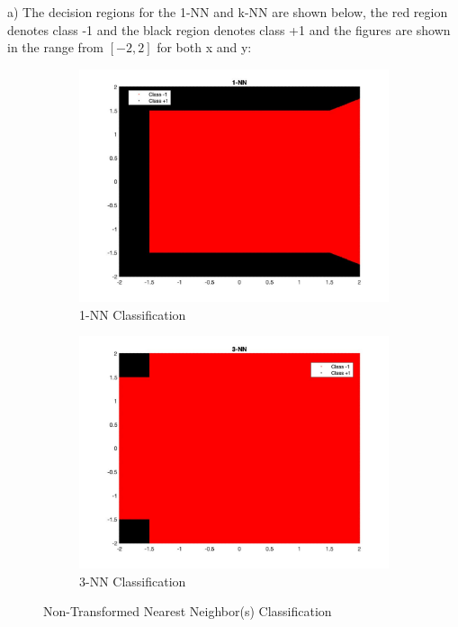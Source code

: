 \documentclass[12pt]{article}
\begin{document}
\newpage
{} \\\\
a) The decision regions for the 1-NN and k-NN are shown below, the red region denotes class -1 and the black region denotes class +1 and the figures are shown in the range from $\left[-2, 2\right]$ for both x and y:
\begin{figure}[H]
\centering
\begin{subfigure}{.5\textwidth}
  \centering
   \includegraphics[scale = 0.22]{1.jpg}
  \caption{1-NN Classification}
  \label{fig:1}
\end{subfigure}%
\begin{subfigure}{.5\textwidth}
  \centering
   \includegraphics[scale = 0.22]{2.jpg}
  \caption{3-NN Classification}
  \label{fig:2}
\end{subfigure}
\caption{Non-Transformed Nearest Neighbor(s) Classification}
\label{fig:test}
\end{figure}
\end{document}
